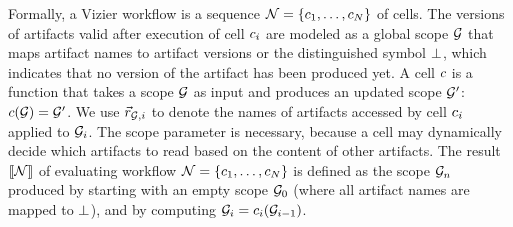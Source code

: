 Formally, a Vizier workflow is a sequence $\mathcal N = \{ c_1, \ldots, c_N \}$ of cells. 
The versions of artifacts valid after execution of cell $c_i$ are modeled as a global scope $\mathcal G$ that maps artifact names to artifact versions or the distinguished symbol $\bot$, which indicates that no version of the artifact has been produced yet.  
A cell $c$ is a function that takes a scope $\mathcal G$ as input and produces an updated scope $\mathcal G'$: $c (\mathcal G) = \mathcal G'$. 
We use $\vec r_{\mathcal G,i}$ to denote the names of artifacts accessed by cell $c_i$ applied to $\mathcal G_i$. 
The scope parameter is necessary, because a cell may dynamically decide which artifacts to read based on the content of other artifacts.
%
The result $\llbracket \mathcal N \rrbracket$ of  evaluating workflow $\mathcal N = \{ c_1, \ldots, c_N \}$ is defined as the scope $\mathcal G_n$ produced by starting with an empty scope $\mathcal G_0$ (where all artifact names are mapped to $\bot$), and by computing $\mathcal G_{i} = c_{i}(\mathcal G_{i-1})$.













